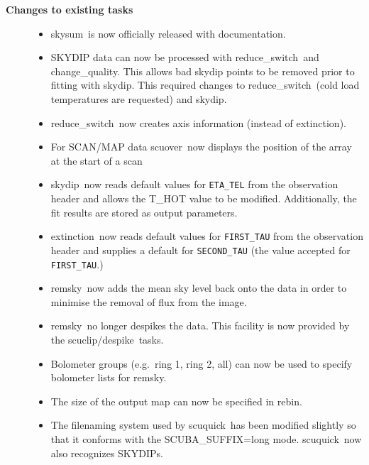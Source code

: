 \documentclass[twoside,11pt]{article}
\newcommand{\task}[1]{{\sf #1}}
\newcommand{\param}[1]{{\tt #1}}
\newcommand{\rebin}{\htmlref{\task{rebin}}{REBIN}}
\newcommand{\chgqual}{\htmlref{\task{change\_quality}}{CHANGE_QUALITY}}
\newcommand{\resw}{\htmlref{\task{reduce\_switch}}{REDUCE_SWITCH}}
\newcommand{\skydip}{\htmlref{\task{skydip}}{SKYDIP}}
\newcommand{\ext}{\htmlref{\task{extinction}}{EXTINCTION}}
\newcommand{\scuquick}{\htmlref{\task{scuquick}}{SCUQUICK}}
\newcommand{\remsky}{\htmlref{\task{remsky}}{REMSKY}}
\newcommand{\scuover}{\htmlref{\task{scuover}}{SCUOVER}}
\newcommand{\skysum}{\htmlref{\task{skysum}}{SKYSUM}}
\newcommand{\despike}{\htmlref{\task{despike}}{DESPIKE}}
\newcommand{\scuclip}{\htmlref{\task{scuclip}}{SCUCLIP}}
\newcommand{\htmlref}[2]{#1}
\begin{document}
\begin{description}
\begin{itemize}
\end{itemize}


\item[\textbf{Changes to existing tasks}] \mbox{}

\begin{itemize}
\item \skysum\ is now officially released with documentation.

\item SKYDIP data can now be processed with \resw\ and \chgqual.
This allows bad skydip points to be removed prior to fitting with \skydip.
This required changes to \resw\ (cold load temperatures are requested)
and \skydip.

\item \resw\ now creates axis information (instead of \ext).

\item For SCAN/MAP data \scuover\ now displays the position of the array at the
start of a scan 

\item \skydip\ now reads default values for \param{ETA\_TEL} from the observation 
header and allows the T\_HOT value to be modified. Additionally, the fit
results are stored as output parameters.

\item \ext\ now reads default values for \param{FIRST\_TAU} from the
observation header and supplies a default for \param{SECOND\_TAU} (the value
accepted for \param{FIRST\_TAU}.)

\item \remsky\ now adds the mean sky level back onto the data in order to
minimise the removal of flux from the image.

\item \remsky\ no longer despikes the data. This facility is now provided by
the  \scuclip/\despike\ tasks.

\item Bolometer groups (e.g.\ ring 1, ring 2, all) can now be used to specify
bolometer lists for \remsky.

\item The size of the output map can now be specified in \rebin.

\item The filenaming system used by \scuquick\ has been modified slightly so
that it conforms with the SCUBA\_SUFFIX=long mode. \scuquick\ now also
recognizes SKYDIPs. 

\end{itemize}

\end{description}
\end{document}
